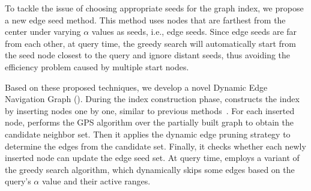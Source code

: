 
To tackle the issue of choosing appropriate seeds for the graph index, we propose a new edge seed method. This method uses nodes that are farthest from the center under varying $\alpha$ values as seeds, i.e., edge seeds. Since edge seeds are far from each other, at query time, the greedy search will automatically start from the seed node closest to the query and ignore distant seeds, thus avoiding the efficiency problem caused by multiple start nodes.

Based on these proposed techniques, we develop a novel Dynamic Edge Navigation Graph (\method). During the index construction phase, \method constructs the index by 
inserting nodes one by one, similar to previous methods~\cite{malkovEfficientRobustApproximate2020,DBLP:journals/is/MalkovPLK14}. For each inserted node, \method performs the GPS algorithm over the partially built graph to obtain the candidate neighbor set. Then it applies the dynamic edge pruning strategy to determine the edges from the candidate set. Finally, it checks whether each newly inserted node can update the edge seed set. At query time, \method employs a variant of the greedy search algorithm, which dynamically skips some edges based on the query's $\alpha$ value and their active ranges.







